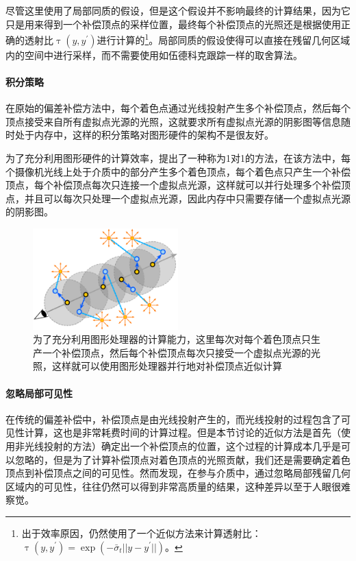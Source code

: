 尽管这里使用了局部同质的假设，但是这个假设并不影响最终的计算结果，因为它只是用来得到一个补偿顶点的采样位置，最终每个补偿顶点的光照还是根据使用正确的透射比$\uptau(y,y^{'})$进行计算的\footnote{出于效率原因，\cite{a:ApproximateBiasCompensationforRenderingSceneswithHeterogeneousParticipatingMedia}仍然使用了一个近似方法来计算透射比：$\uptau(y,y^{'})=\exp(-\bar{\sigma}_t||y-y^{'}||)$。}。局部同质的假设使得可以直接在残留几何区域内的空间中进行采样，而不需要使用如伍德科克跟踪一样的取舍算法。



\paragraph{积分策略}
在原始的偏差补偿方法中，每个着色点通过光线投射产生多个补偿顶点，然后每个顶点接受来自所有虚拟点光源的光照，这就要求所有虚拟点光源的阴影图等信息随时处于内存中，这样的积分策略对图形硬件的架构不是很友好。

为了充分利用图形硬件的计算效率，\cite{a:ApproximateBiasCompensationforRenderingSceneswithHeterogeneousParticipatingMedia}提出了一种称为1对1的方法，在该方法中，每个摄像机光线上处于介质中的部分产生多个着色顶点，每个着色点只产生一个补偿顶点，每个补偿顶点每次只连接一个虚拟点光源，这样就可以并行处理多个补偿顶点，并且可以每次只处理一个虚拟点光源，因此内存中只需要存储一个虚拟点光源的阴影图。

\begin{figure}
	\sidecaption
	\includegraphics[width=0.5\textwidth]{figures/ir/connection-strategies}
	\caption{为了充分利用图形处理器的计算能力，这里每次对每个着色顶点只生产一个补偿顶点，然后每个补偿顶点每次只接受一个虚拟点光源的光照，这样就可以使用图形处理器并行地对补偿顶点近似计算}
	\label{f:connection-strategies}
\end{figure}



\paragraph{忽略局部可见性}
在传统的偏差补偿中，补偿顶点是由光线投射产生的，而光线投射的过程包含了可见性计算，这也是非常耗费时间的计算过程。但是本节讨论的近似方法是首先（使用非光线投射的方法）确定出一个补偿顶点的位置，这个过程的计算成本几乎是可以忽略的，但是为了计算补偿顶点对着色顶点的光照贡献，我们还是需要确定着色顶点到补偿顶点之间的可见性。然而\cite{a:ApproximateBiasCompensationforRenderingSceneswithHeterogeneousParticipatingMedia}发现，在参与介质中，通过忽略局部残留几何区域内的可见性，往往仍然可以得到非常高质量的结果，这种差异以至于人眼很难察觉。




